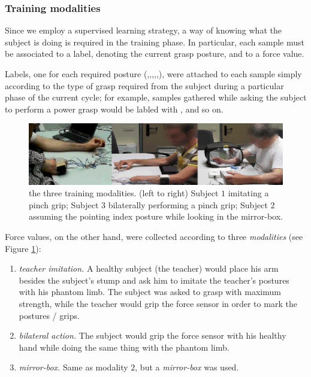 \subsubsection{Training modalities}

Since we employ a supervised learning strategy, a way of knowing what the subject is
doing is required in the training phase. In particular, each sample must be associated
to a label, denoting the current grasp posture, and to a force value.

Labels, one for each required posture (\re,\po,\pw,\pi,\tr,\hs),
were attached to each sample simply according to the
type of grasp required from the subject during a particular phase of the current
cycle; for example, samples gathered while asking the subject to perform a power grasp
would be labled with \po, and so on.

\begin{figure}[!ht] \centering
  \includegraphics[width=\textwidth]{figs/modalities}
  \caption{the three training modalities. (left to right) Subject $1$
    imitating a pinch grip; Subject $3$ bilaterally performing a pinch
    grip; Subject $2$ assuming the pointing index posture while
    looking in the mirror-box.}
  \label{fig:modalities}
\end{figure}

Force values, on the other hand, were collected according to three
\emph{modalities} (see Figure \ref{fig:modalities}):

\begin{enumerate}

  \item \emph{teacher imitation.} A healthy subject (the teacher)
    would place his arm besides the subject's stump and ask him
    to imitate the teacher's postures with his phantom limb. The
    subject was asked to grasp with maximum strength,
    while the teacher would grip the force sensor in order to mark the
    postures / grips.

  \item \emph{bilateral action.} The subject would grip the
    force sensor with his healthy hand while doing the same
    thing with the phantom limb.

  \item \emph{mirror-box.} Same as modality $2$, but a \emph{mirror-box}
    \cite{mirror-box} was used.

\end{enumerate}

